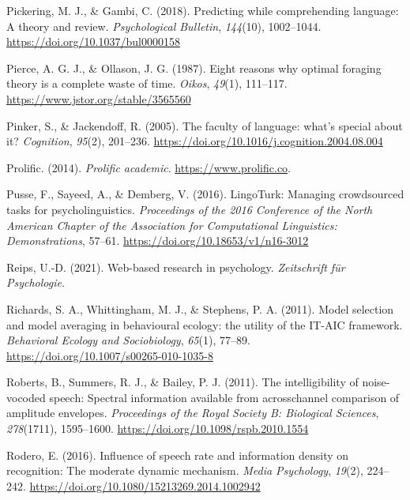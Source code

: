 \documentclass[a4paper, nobind]{templates/ociamthesis}
\newlength{\cslhangindent}
\newenvironment{CSLReferences}[2] %
 {%
  \setlength{\parindent}{0pt}
  \ifodd #1
  \let\oldpar\par
  \def\par{\hangindent=\cslhangindent\oldpar}
  \fi
  \setlength{\parskip}{1mm}
  \setlength{\baselineskip}{6mm}
 }%
 {}
\begin{document}
\begin{CSLReferences}{1}{0}
\leavevmode{}%
Pickering, M. J., \& Gambi, C. (2018). Predicting while comprehending language: A theory and review. \emph{Psychological Bulletin}, \emph{144}(10), 1002--1044. \url{https://doi.org/10.1037/bul0000158}

\leavevmode{}%
Pierce, A. G. J., \& Ollason, J. G. (1987). {Eight reasons why optimal foraging theory is a complete waste of time}. \emph{Oikos}, \emph{49}(1), 111--117. \url{https://www.jstor.org/stable/3565560}

\leavevmode{}%
Pinker, S., \& Jackendoff, R. (2005). The faculty of language: what's special about it? \emph{Cognition}, \emph{95}(2), 201--236. \url{https://doi.org/10.1016/j.cognition.2004.08.004}

\leavevmode{}%
Prolific. (2014). \emph{Prolific academic}. \url{https://www.prolific.co}.

\leavevmode{}%
Pusse, F., Sayeed, A., \& Demberg, V. (2016). {LingoTurk: Managing crowdsourced tasks for psycholinguistics}. \emph{Proceedings of the 2016 Conference of the North American Chapter of the Association for Computational Linguistics: Demonstrations}, 57--61. \url{https://doi.org/10.18653/v1/n16-3012}

\leavevmode{}%
Reips, U.-D. (2021). Web-based research in psychology. \emph{Zeitschrift f{ü}r Psychologie}.

\leavevmode{}%
Richards, S. A., Whittingham, M. J., \& Stephens, P. A. (2011). Model selection and model averaging in behavioural ecology: the utility of the IT-AIC framework. \emph{Behavioral Ecology and Sociobiology}, \emph{65}(1), 77--89. \url{https://doi.org/10.1007/s00265-010-1035-8}

\leavevmode{}%
Roberts, B., Summers, R. J., \& Bailey, P. J. (2011). The intelligibility of noise-vocoded speech: Spectral information available from acrosschannel comparison of amplitude envelopes. \emph{Proceedings of the Royal Society B: Biological Sciences}, \emph{278}(1711), 1595--1600. \url{https://doi.org/10.1098/rspb.2010.1554}

\leavevmode{}%
Rodero, E. (2016). {Influence of speech rate and information density on recognition: The moderate dynamic mechanism}. \emph{Media Psychology}, \emph{19}(2), 224--242. \url{https://doi.org/10.1080/15213269.2014.1002942}


\end{CSLReferences}
\end{document}
